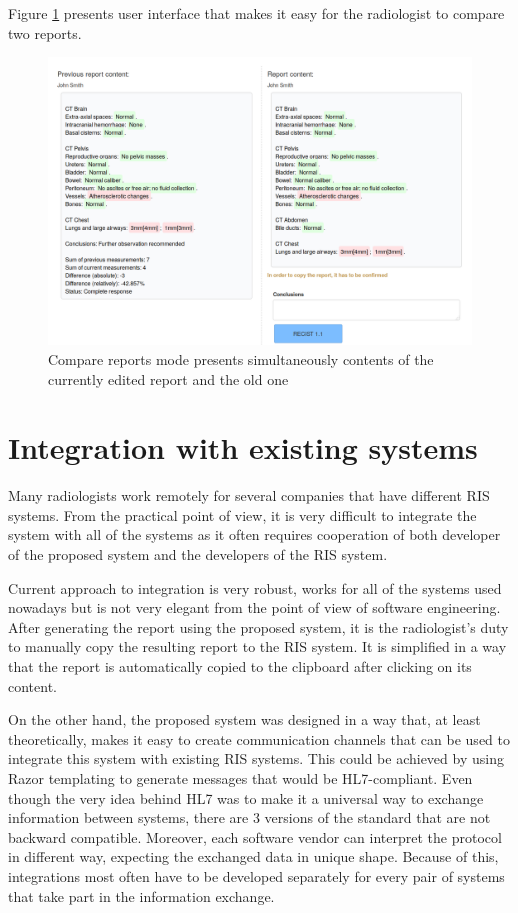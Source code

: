 \documentclass[12pt, twoside, openany]{report}
\theoremstyle{definition}
\begin{document}
Figure \ref{fig:compare-report} presents user interface that makes it easy for the radiologist to compare two reports.

\begin{figure}
	\centering
	\includegraphics[width=\linewidth]{compare-reports}
	\caption{Compare reports mode presents simultaneously contents of the currently edited report and the old one
		\label{fig:compare-report}
	}
\end{figure}

\section{Integration with existing systems}
Many radiologists work remotely for several companies that have different RIS systems. From the practical point of view, it is very difficult to integrate the system with all of the systems as it often requires cooperation of both developer of the proposed system and the developers of the RIS system. 

Current approach to integration is very robust, works for all of the systems used nowadays but is not very elegant from the point of view of software engineering. 
After generating the report using the proposed system, it is the radiologist's duty to manually copy the resulting report to the RIS system. It is simplified in a way that the report is automatically copied to the clipboard after clicking on its content.

On the other hand, the proposed system was designed in a way that, at least theoretically, makes it easy to create communication channels that can be used to integrate this system with existing RIS systems. This could be achieved by using Razor templating to generate messages that would be HL7-compliant. Even though the very idea behind HL7 was to make it a universal way to exchange information between systems, there are 3 versions of the standard that are not backward compatible. Moreover, each software vendor can interpret the protocol in different way, expecting the exchanged data in unique shape. Because of this, integrations most often have to be developed separately for every pair of  systems that take part in the information exchange.
\end{document}
